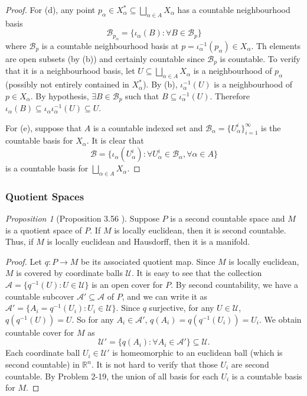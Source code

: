\documentclass[a4paper]{article}
\theoremstyle{remark}
\newtheorem{prop}{Proposition}
\newcommand{\subhim}{\subseteq} %
\begin{document}
\begin{proof}
	For (d), any point $p_{\alpha} \in X_{\alpha}^* \subhim \bigsqcup_{\alpha \in A} X_{\alpha}$ has a countable neighbourhood basis 
	$$
	\mathcal{B}_{p_{\alpha}} = \{ \iota_{\alpha}(B) : \forall B\in \mathcal{B}_p \}
	$$
	where $\mathcal{B}_p$ is a countable neighbourhood basis at $p = \iota_{\alpha}^{-1}(p_{\alpha}) \in X_{\alpha}$. Th elements are open subsets (by (b)) and certainly countable since $\mathcal{B}_p$ is countable. To verify that it is a neighbourhood basis, let $U\subhim \bigsqcup_{\alpha \in A} X_{\alpha}$ is a neighbourhood of $p_{\alpha}$ (possibly not entirely contained in $X_{\alpha}^*$). By (b), $\iota_{\alpha}^{-1}(U)$ is a neighbourhood of $p \in X_{\alpha}$. By hypothesis, $\exists B \in \mathcal{B}_p$ such that $B \subhim \iota_{\alpha}^{-1}(U)$. Therefore $\iota_{\alpha}(B) \subhim \iota_{\alpha} \iota_{\alpha}^{-1}(U) \subhim U$.  
	
	For (e), suppose that $A$ is a countable indexed set and $\mathcal{B}_{\alpha} = \{U_{\alpha}^i\}_{i=1}^{\infty}$ is the countable basis for $X_{\alpha}$. It is clear that 
	$$
	\mathcal{B} = \{\iota_{\alpha}(U_{\alpha}^i) : \forall U_{\alpha}^i \in \mathcal{B}_{\alpha}, \forall \alpha \in A \}
	$$
	is a countable basis for $\bigsqcup_{\alpha \in A} X_{\alpha}$.
\end{proof}

\subsubsection*{Quotient Spaces}
\begin{prop}[Proposition 3.56 \cite{LeeTM}]
	Suppose $P$ is a second countable space and $M$ is a quotient space of $P$. If $M$ is locally euclidean, then it is second countable. Thus, if $M$ is locally euclidean and Hausdorff, then it is a manifold.
\end{prop}
\begin{proof}
	Let $q : P \to M$ be its associated quotient map. Since $M$ is locally euclidean, $M$ is covered by coordinate balls $\mathcal{U}$. It is easy to see that the collection $\mathcal{A} = \{q^{-1}(U) : U \in \mathcal{U} \}$ is an open cover for $P$. By second countability, we have a countable subcover $\mathcal{A}' \subhim \mathcal{A}$ of $P$, and we can write it as $\mathcal{A}' = \{ A_i = q^{-1}(U_i) : U_i \in \mathcal{U} \}$. Since $q$ surjective, for any $U \in \mathcal{U}$, $q(q^{-1}(U)) = U$. So for any $A_i \in \mathcal{A}'$, $q(A_i) = q(q^{-1}(U_i)) = U_i$. We obtain countable cover for $M$ as 
	$$
	\mathcal{U}' = \{ q(A_i) :  \forall A_i \in \mathcal{A}'  \} \subhim \mathcal{U}.
	$$
	Each coordinate ball $U_i \in \mathcal{U}'$ is homeomorphic to an euclidean ball (which is second countable) in $\mathbb{R}^n$. It is not hard to verify that those $U_i$ are second countable. By Problem 2-19, the union of all basis for each $U_i$ is a countable basis for $M$.   
\end{proof}
\end{document}
